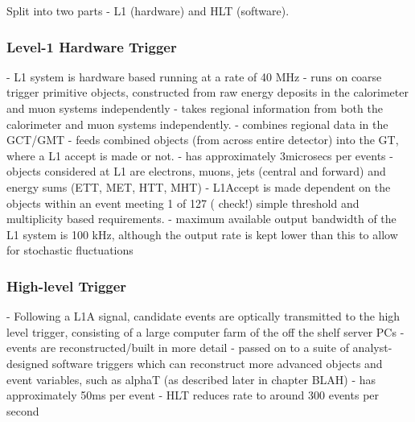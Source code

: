 Split into two parts - L1 (hardware) and HLT (software).

\subsubsection{Level-1 Hardware Trigger}
- L1 system is hardware based running at a rate of 40 MHz
- runs on coarse trigger primitive objects, constructed from raw energy deposits
in the calorimeter and muon systems independently
    - takes regional information from both the calorimeter and muon systems 
    independently.
    - combines regional data in the GCT/GMT
    - feeds combined objects (from across entire detector) into the GT, where a 
    L1 accept is made or not.
- has approximately 3microsecs per events
- objects considered at L1 are electrons, muons, jets (central and forward) and 
energy sums (ETT, MET, HTT, MHT)
- L1Accept is made dependent on the objects within an event meeting 1 of 127 (
check!) simple threshold and multiplicity based requirements.
- maximum available output bandwidth of the L1 system is 100 kHz, although the 
output rate is kept lower than this to allow for stochastic fluctuations

\subsubsection{High-level Trigger}
- Following a L1A signal, candidate events are optically transmitted to the high
level trigger, consisting of a large computer farm of the off the shelf server 
PCs
- events are reconstructed/built in more detail
- passed on to a suite of analyst-designed software triggers which can 
reconstruct more advanced objects and event variables, such as alphaT (as 
described later in chapter BLAH) - has approximately 50ms per event
- HLT reduces rate to around 300 events per second

